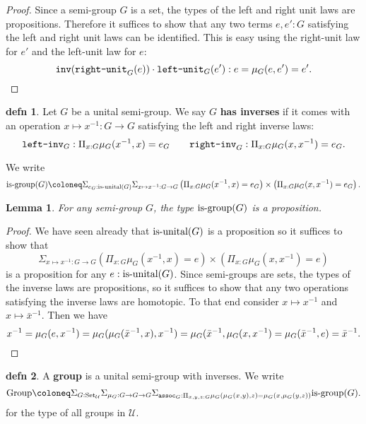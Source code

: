 \documentclass{amsart}
\theoremstyle{theorem}
\newtheorem*{lem}{Lemma}
\theoremstyle{definition}
\newtheorem*{defn}{defn}
\theoremstyle{remark}
\newcommand{\0}{\mathbbe{0}}
\newcommand{\1}{\mathbbe{1}}
\newcommand{\2}{\mathbbe{2}}
\newcommand{\3}{\mathbbe{3}}
\newcommand{\4}{\mathbbe{4}}
\newcommand{\term}[1]{{\textup{\texttt{#1}}}}
\newcommand{\type}[1]{{\textup{#1}}}
\newcommand{\inv}{\term{inv}}
\newcommand{\UU}{{\mathcal{U}}}
\newcommand{\is}[1]{\type{is-{#1}}}
\newcommand{\Set}{\type{Set}_{\UU}}
\begin{document}
\begin{proof}
Since a semi-group $G$ is a set, the types of the left and right unit laws are propositions. Therefore it suffices to show that any two terms $e,e' : G$ satisfying the left and right unit laws can be identified. This is easy using the right-unit law for $e'$ and the left-unit law for $e$:
\[ \inv(\term{right-unit}_G(e)) \cdot \term{left-unit}_G(e') : e = \mu_G(e,e') = e'. \qedhere\]
\end{proof}

\begin{defn} Let $G$ be a unital semi-group. We say $G$ \textbf{has inverses} if it comes with an operation $x \mapsto x^{-1} : G \to G$ satisfying the left and right inverse laws:
\[ \term{left-inv}_G : \Pi_{x:G} \mu_G(x^{-1},x) = e_G \qquad \term{right-inv}_G : \Pi_{x:G} \mu_G(x,x^{-1}) = e_G.\]
\end{defn}

We write
\[ \is{group}(G) \coloneq \Sigma_{e_G: \is{unital}(G)} \Sigma_{x \mapsto x^{-1} :G \to G} \left(\Pi_{x:G} \mu_G(x^{-1},x) = e_G\right) \times \left( \Pi_{x:G} \mu_G(x,x^{-1}) = e_G \right).\]

\begin{lem} For any semi-group $G$, the type $\is{group}(G)$ is a proposition.
\end{lem}
\begin{proof}
We have seen already that $\is{unital}(G)$ is a proposition so it suffices to show that \[
\Sigma_{x \mapsto x^{-1} :G \to G} \left(\Pi_{x:G} \mu_G(x^{-1},x) = e\right) \times \left( \Pi_{x:G} \mu_G(x,x^{-1}) = e \right)\]
is a proposition for any $e : \is{unital}(G)$. Since semi-groups are sets, the types of the inverse laws are propositions, so it suffices to show that any two operations satisfying the inverse laws are homotopic. To that end consider $x \mapsto x^{-1}$ and $x \mapsto \bar{x}^{-1}$. Then we have
\[ x^{-1} = \mu_G(e, x^{-1}) = \mu_G(\mu_G(\bar{x}^{-1},x),x^{-1}) = \mu_G(\bar{x}^{-1},\mu_G(x,x^{-1}) = \mu_G(\bar{x}^{-1}, e) = \bar{x}^{-1}. \qedhere\]
\end{proof}

\begin{defn} A \textbf{group} is a unital semi-group with inverses. We write 
\[\type{Group} \coloneq \Sigma_{G: \Set}\Sigma_{\mu_G :G \to G \to G} \Sigma_{\term{assoc}_G : \Pi_{x,y,z:G} \mu_G(\mu_G(x,y),z) = \mu_G(x,\mu_G(y,z))} \is{group}(G).\]
 for the type of all groups in $\UU$.
\end{defn}
\end{document}
